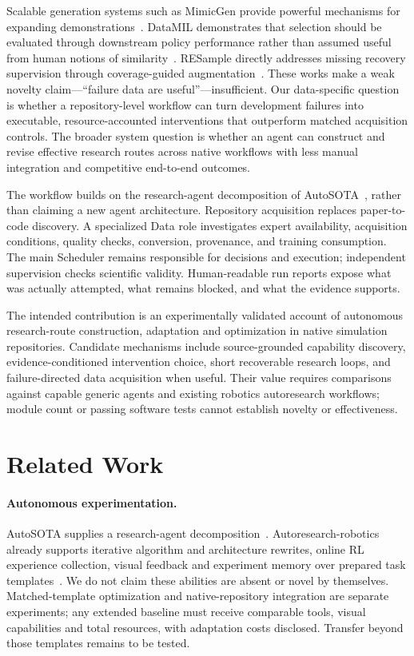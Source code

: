 \documentclass[10pt,twocolumn,letterpaper]{article}
\begin{document}
Scalable generation systems such as MimicGen provide powerful mechanisms for
expanding demonstrations~\cite{mimicgen}. DataMIL demonstrates that selection
should be evaluated through downstream policy performance rather than assumed
useful from human notions of similarity~\cite{datamil}. RESample directly addresses
missing recovery supervision through coverage-guided augmentation~\cite{resample}.
These works make a weak novelty claim---``failure data are useful''---insufficient.
Our data-specific question is whether a repository-level workflow can turn
development failures into executable, resource-accounted interventions that
outperform matched acquisition controls. The broader system question is whether
an agent can construct and revise effective research routes across native
workflows with less manual integration and competitive end-to-end outcomes.

The workflow builds on the research-agent decomposition of AutoSOTA~\cite{autosota}, rather than
claiming a new agent architecture. Repository acquisition replaces paper-to-code
discovery. A specialized Data role investigates expert availability, acquisition
conditions, quality checks, conversion, provenance, and training consumption. The
main Scheduler remains responsible for decisions and execution; independent
supervision checks scientific validity. Human-readable run reports expose what
was actually attempted, what remains blocked, and what the evidence supports.

The intended contribution is an experimentally validated account of autonomous
research-route construction, adaptation and optimization in native simulation
repositories. Candidate mechanisms include source-grounded capability discovery,
evidence-conditioned intervention choice, short recoverable research loops, and
failure-directed data acquisition when useful. Their value requires comparisons
against capable generic agents and existing robotics autoresearch workflows;
module count or passing software tests cannot establish novelty or effectiveness.

\section{Related Work}
\paragraph{Autonomous experimentation.}
AutoSOTA supplies a research-agent decomposition~\cite{autosota}.
Autoresearch-robotics already supports iterative algorithm and architecture
rewrites, online RL experience collection, visual feedback and experiment memory
over prepared task templates~\cite{autoresearchrobotics}. We do not claim these
abilities are absent or novel by themselves. Matched-template optimization and
native-repository integration are separate experiments; any extended baseline
must receive comparable tools, visual capabilities and total resources, with
adaptation costs disclosed. Transfer beyond those templates remains to be tested.
\end{document}
